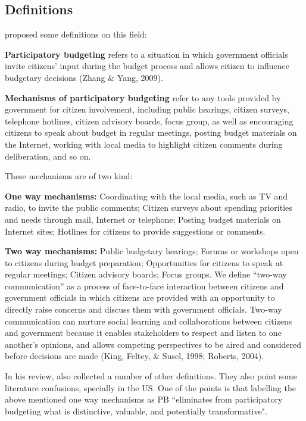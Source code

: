 \subsection{Definitions}

\cite{Zhang2013} proposed some definitions on this field:

\noindent\textbf{Participatory budgeting} refers to a situation in which government officials invite citizens' input during the budget process and allows citizen to influence budgetary decisions (Zhang \& Yang, 2009).

\noindent\textbf{Mechanisms of participatory budgeting} refer to any tools provided by government for citizen involvement, including public hearings, citizen surveys, telephone hotlines, citizen advisory boards, focus group, as well as encouraging citizens to speak about budget in regular meetings, posting budget materials on the Internet, working with local media to highlight citizen comments during deliberation, and so on.

These mechanisms are of two kind:

\noindent\textbf{One way mechanisms:} Coordinating with the local media, such as TV and radio, to invite the public comments; Citizen surveys about spending priorities and needs through mail, Internet or telephone; Posting budget materials on Internet sites; Hotlines for citizens to provide suggestions or comments.

\noindent\textbf{Two way mechanisms:} Public budgetary hearings; Forums or workshops open to citizens during budget preparation; Opportunities for citizens to speak at regular meetings; Citizen advisory boards; Focus groups.
We define “two-way communication” as a process of face-to-face interaction between citizens and government officials in which citizens are provided with an opportunity to directly raise concerns and discuss them with government officials. Two-way communication can nurture social learning and collaborations between citizens and government because it enables stakeholders to respect and listen to one another’s opinions, and allows competing perspectives to be aired and considered before decisions are made (King, Feltey, \& Susel, 1998; Roberts, 2004).

In his review, \cite{Miller2014} also collected a number of other definitions. They also point some literature confusions, specially in the US. One of the points is that labelling the above mentioned one way mechanisms as PB ``eliminates from participatory budgeting what is distinctive, valuable, and potentially transformative".

